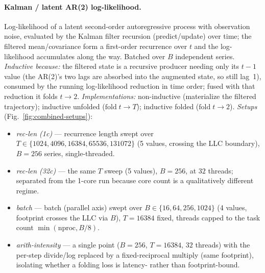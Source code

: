 \paragraph{Kalman / latent AR(2) log-likelihood.}
Log-likelihood of a latent second-order autoregressive process with observation
noise, evaluated by the Kalman filter recursion (predict/update) over time; the
filtered mean/covariance form a first-order recurrence over $t$ and the
log-likelihood accumulates along the way. Batched over $B$ independent series.
\emph{Inductive because:} the filtered state is a recursive producer needing only
its $t{-}1$ value (the AR(2)'s two lags are absorbed into the augmented state, so
still lag~1), consumed by the running log-likelihood reduction in time order; fused
with that reduction it folds $t\!\to\!2$.
\emph{Implementations:} non-inductive (materialize the filtered trajectory);
inductive unfolded ($\mathrm{fold}\;t\!\to\!T$); inductive folded
($\mathrm{fold}\;t\!\to\!2$).
\emph{Setups} (Fig.~\ref{fig:combined-setups}):
\begin{itemize}\itemsep2pt
  \item \textit{rec-len (1c)} --- recurrence length swept over
    $T\in\{1024,4096,16384,65536,131072\}$ (5 values, crossing the LLC boundary),
    $B{=}256$ series, single-threaded.
  \item \textit{rec-len (32c)} --- the same $T$ sweep (5 values), $B{=}256$, at
    $32$ threads; separated from the 1-core run because core count is a
    qualitatively different regime.
  \item \textit{batch} --- batch (parallel axis) swept over
    $B\in\{16,64,256,1024\}$ (4 values, footprint crosses the LLC via $B$),
    $T{=}16384$ fixed, threads capped to the task count $\min(\mathrm{nproc},B/8)$.
  \item \textit{arith-intensity} --- a single point ($B{=}256$, $T{=}16384$, $32$
    threads) with the per-step divide/log replaced by a fixed-reciprocal multiply
    (same footprint), isolating whether a folding loss is latency- rather than
    footprint-bound.
\end{itemize}

